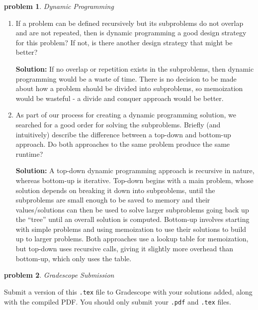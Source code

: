 \documentclass[10pt]{article}
\newcommand{\solution}[1]{\color{blue}\hfill\break\noindent\textbf{Solution:} #1\color{black}}
\newtheorem{problem}{\sc\color{cit}problem}
\begin{document}
\begin{problem}Dynamic Programming\end{problem}
\begin{enumerate}
\item If a problem can be defined recursively but its subproblems do not overlap and are not repeated, then is dynamic programming a good design strategy for this problem?  If not, is there another design strategy that might be better?

    \solution{
    If no overlap or repetition exists in the subproblems, then dynamic programming would be a waste of time. There is no decision to be made about how a problem should be divided into subproblems, so memoization would be wasteful - a divide and conquer approach would be better.
    }
\item As part of our process for creating a dynamic programming solution, we searched for a good order for solving the subproblems.  Briefly (and intuitively) describe the difference between a top-down and bottom-up approach.  Do both approaches to the same problem produce the same runtime?

    \solution{
    A top-down dynamic programming approach is recursive in nature, whereas bottom-up is iterative. Top-down begins with a main problem, whose solution depends on breaking it down into subproblems, until the subproblems are small enough to be saved to memory and their values/solutions can then be used to solve larger subproblems going back up the “tree” until an overall solution is computed. Bottom-up involves starting with simple problems and using memoization to use their solutions to build up to larger problems. Both approaches use a lookup table for memoization, but top-down uses recursive calls, giving it slightly more overhead than bottom-up, which only uses the table.
    }
\end{enumerate}

\begin{problem} Gradescope Submission \end{problem}
Submit a version of this \verb|.tex| file to Gradescope with your solutions added, along with the compiled PDF.  You should only submit your \verb|.pdf| and \verb|.tex| files.
\end{document}
